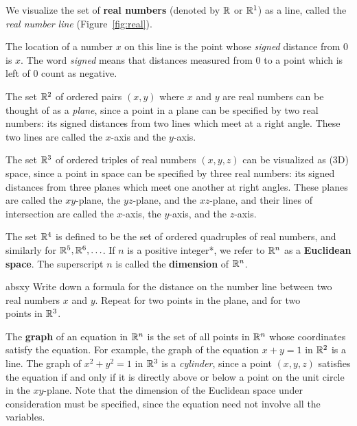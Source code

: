 \documentclass{watsonbook}
\begin{document}
We visualize the set of \textbf{real numbers} (denoted by $\mathbb{R}$ or
$\mathbb{R}^1$) as a line, called the \textit{real number line}
(Figure~\ref{fig:real}).

The location of a number $x$ on this line is the point whose
\textit{signed} distance from 0 is $x$. The word \textit{signed} means
that distances measured from 0 to a point which is left of 0 count as
negative.

The set $\mathbb{R}^2$ of ordered pairs $(x,y)$ where $x$ and $y$ are real
numbers can be thought of as a \textit{plane}, since a point in a
plane can be specified by two real numbers: its signed distances from
two lines which meet at a right angle. These two lines are called the
$x$-axis and the $y$-axis.

The set $\mathbb{R}^3$ of ordered triples of real numbers $(x,y,z)$ can be
visualized as (3D) space, since a point in space can be
specified by three real numbers: its signed distances from three
planes which meet one another at right angles. These planes are called
the $xy$-plane, the $yz$-plane, and the $xz$-plane, and their lines of
intersection are called the $x$-axis, the $y$-axis, and the $z$-axis. 

The set $\mathbb{R}^4$ is defined to be the set of ordered quadruples of real
numbers, and similarly for $\mathbb{R}^5, \mathbb{R}^6, \ldots$.  
 If
$n$ is a positive integer*, we refer to $\mathbb{R}^n$ as a \textbf{Euclidean
  space}. The superscript $n$
is called the \textbf{dimension} of $\mathbb{R}^n$. 

\begin{exercise}{}{absxy}
  Write down a formula for the distance on the number line between two \\
  real numbers $x$ and $y$. Repeat for two points in the plane, and
  for two \\ points in $\mathbb{R}^3$. 
\end{exercise}

The \textbf{graph} of an equation in $\mathbb{R}^n$ is the set of all points
in $\mathbb{R}^n$ whose coordinates satisfy the equation. For example, the
graph of the equation $x + y = 1$ in $\mathbb{R}^2$ is a line. The graph of
$x^2 + y^2 = 1$ in $\mathbb{R}^3$ is a \textit{cylinder}, since a point
$(x,y,z)$ satisfies the equation if and only if it is directly above
or below a point on the unit circle in the $xy$-plane. Note that the
dimension of the Euclidean space under consideration must be
specified, since the equation need not involve all the variables.
\end{document}
